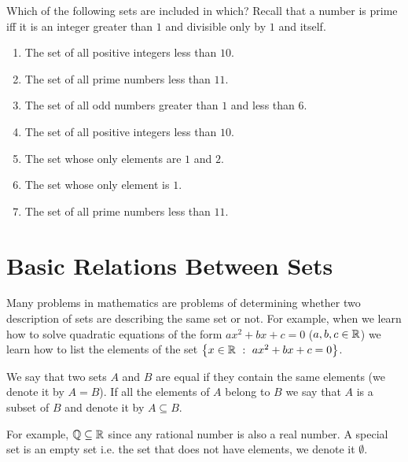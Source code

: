 \begin{exercise}
  \label{exercise:inclusion}

  Which of the following sets are included in which? Recall that a number is
  prime iff it is an integer greater than $1$ and divisible only by $1$ and
  itself.
  \begin{enumerate}
    \item The set of all positive integers less than $10$.
    \item The set of all prime numbers less than $11$.
    \item The set of all odd numbers greater than $1$ and less than $6$.
    \item The set of all positive integers less than $10$.
    \item The set whose only elements are $1$ and $2$.
    \item The set whose only element is $1$.
    \item The set of all prime numbers less than $11$.
  \end{enumerate}
\end{exercise}

\section{Basic Relations Between Sets}
Many problems in mathematics are problems of determining whether two description
of sets are describing the same set or not. For example, when we learn how to
solve quadratic equations of the form $ax^2 + bx + c = 0$ ($a, b, c \in \mathbb{R}$) we
learn how to list the elements of the set $\set[ax^2 + bx + c = 0]{x \in \R}$.

We say that two sets $A$ and $B$ are equal if they contain the
same elements (we denote it by $A = B$). If all the elements of $A$ belong to
$B$ we say that $A$ is a subset of $B$ and denote it by $A \subseteq B$.

For example, $\mathbb{Q} \subseteq \mathbb{R}$ since any rational number is
also a real number.
A special set is an empty set i.e. the set that does not have elements, we
denote it $\emptyset$.

